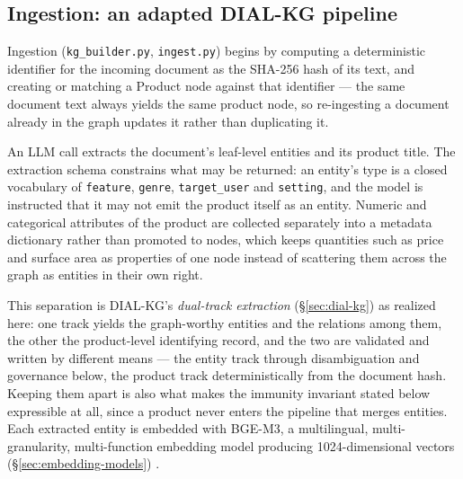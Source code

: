 \subsection{Ingestion: an adapted DIAL-KG pipeline}
\label{sec:coldrag-ingestion}

Ingestion (\texttt{kg\_builder.py}, \texttt{ingest.py}) begins by computing a deterministic identifier for the incoming document as the SHA-256 hash of its text, and creating or matching a Product node against that identifier — the same document text always yields the same product node, so re-ingesting a document already in the graph updates it rather than duplicating it. 

An LLM call extracts the document's leaf-level entities and its product title. The extraction schema constrains what may be returned: an entity's type is a closed vocabulary of \texttt{feature}, \texttt{genre}, \texttt{target\_user} and \texttt{setting}, and the model is instructed that it may not emit the product itself as an entity. Numeric and categorical attributes of the product are collected separately into a metadata dictionary rather than promoted to nodes, which keeps quantities such as price and surface area as properties of one node instead of scattering them across the graph as entities in their own right. 

This separation is DIAL-KG's \emph{dual-track extraction} (\S\ref{sec:dial-kg}) as realized here: one track yields the graph-worthy entities and the relations among them, the other the product-level identifying record, and the two are validated and written by different means — the entity track through disambiguation and governance below, the product track deterministically from the document hash. Keeping them apart is also what makes the immunity invariant stated below expressible at all, since a product never enters the pipeline that merges entities. Each extracted entity is embedded with BGE-M3, a multilingual, multi-granularity, multi-function embedding model producing 1024-dimensional vectors (\S\ref{sec:embedding-models}) \citep{chen2024m3}.

